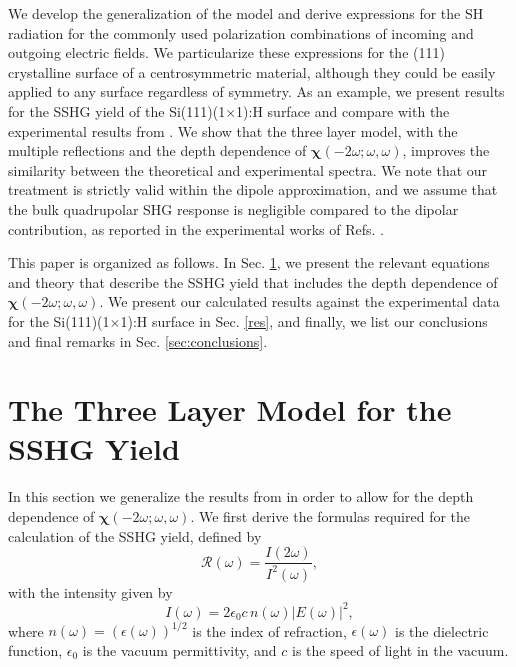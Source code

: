\documentclass[utf8]{frontiersSCNS}
\begin{document}
We develop the generalization of the model and derive expressions for the SH
radiation for the commonly used polarization combinations of incoming and
outgoing electric fields. We particularize these expressions for the (111)
crystalline surface of a centrosymmetric material, although they could be easily
applied to any surface regardless of symmetry. As an example, we present results
for the SSHG yield of the Si(111)(1$\times$1):H surface and compare with the
experimental results from \cite{mejiaPRB02}. We show that the three layer model,
with the multiple reflections and the depth dependence of
$\boldsymbol{\chi}(-2\omega;\omega,\omega)$, improves the similarity between the
theoretical and experimental spectra. We note that our treatment is strictly
valid within the dipole approximation, and we assume that the bulk quadrupolar
SHG response is negligible compared to the dipolar contribution, as reported in
the experimental works of Refs. \citep{aktsipetrovJETP86, sipePRB87, xuJVST97,
guyotPRB88, downerSIA01, shenAPB99}.

This paper is organized as follows. In Sec. \ref{sec:threelayer}, we present the
relevant equations and theory that describe the SSHG yield that includes the
depth dependence of $\boldsymbol{\chi}(-2\omega;\omega,\omega)$. We present our
calculated results against the experimental data for the Si(111)(1$\times$1):H
surface in Sec. \ref{res}, and finally, we list our conclusions and final
remarks in Sec. \ref{sec:conclusions}.


\section{The Three Layer Model for the SSHG Yield}\label{sec:threelayer}

In this section we generalize the results from \cite{andersonPRB16b} in order to
allow for the depth dependence of $\boldsymbol{\chi}(-2\omega;\omega,\omega)$.
We first derive the formulas required for the calculation of the SSHG yield,
defined by
\begin{equation}\label{eq:rintensities}
\mathcal{R}(\omega)=\frac{I(2\omega)}{I^2(\omega)},
\end{equation}
with the intensity given by \citep{boyd, sutherland}
\begin{equation}\label{eq:intensity}
I(\omega)=
2\epsilon_{0}c\, n(\omega)|E(\omega)|^{2},
\end{equation}
where $n(\omega) = (\epsilon(\omega))^{1/2}$ is the index of refraction,
$\epsilon(\omega)$ is the dielectric function, $\epsilon_{0}$ is the vacuum
permittivity, and $c$ is the speed of light in the vacuum.
\end{document}
